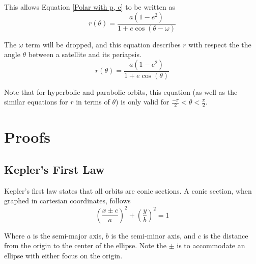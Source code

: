 \documentclass{article}
\begin{document}
This allows Equation \eqref{Polar with p, e} to be written as
\begin{equation*}
    r(\theta)=\frac{a(1-e^2)}{1+e\cos(\theta-\omega)}
\end{equation*}

The $\omega$ term will be dropped, and this equation describes $r$ with respect the the angle $\theta$ between a satellite and its periapsis.
\begin{equation}\label{Polar Final}
    r(\theta)=\frac{a(1-e^2)}{1+e\cos(\theta)}
\end{equation}

Note that for hyperbolic and parabolic orbits, this equation (as well as the similar equations for $r$ in terms of $\theta$) is only valid for $\frac{-\pi}{2}<\theta<\frac{\pi}{2}$.

\pagebreak
\section{Proofs}

\bigskip\bigskip
\subsection{Kepler's First Law}\label{sec:Kepler's First Law}

Kepler's first law states that all orbits are conic sections. A conic section, when graphed in cartesian coordinates, follows
$$\left(\frac{x\pm{}c}{a}\right)^2+\left(\frac{y}{b}\right)^2=1$$

Where $a$ is the semi-major axis, $b$ is the semi-minor axis, and $c$ is the distance from the origin to the center of the ellipse. Note the $\pm$ is to accommodate an ellipse with either focus on the origin.
\end{document}
